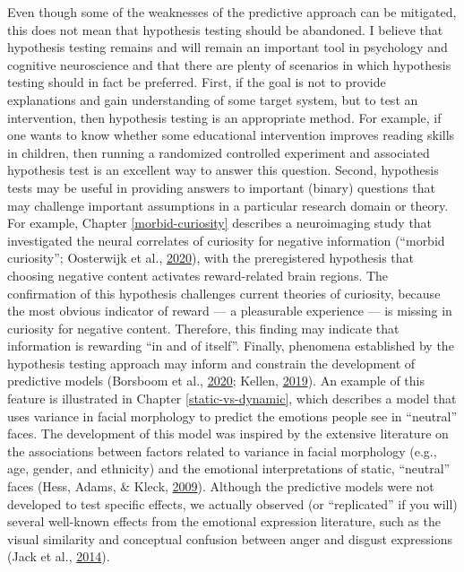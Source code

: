 \documentclass[12pt,american,a4paper,oneside,]{memoir} %
\begin{document}
Even though some of the weaknesses of the predictive approach can be mitigated, this does not mean that hypothesis testing should be abandoned. I believe that hypothesis testing remains and will remain an important tool in psychology and cognitive neuroscience and that there are plenty of scenarios in which hypothesis testing should in fact be preferred. First, if the goal is not to provide explanations and gain understanding of some target system, but to test an intervention, then hypothesis testing is an appropriate method. For example, if one wants to know whether some educational intervention improves reading skills in children, then running a randomized controlled experiment and associated hypothesis test is an excellent way to answer this question. Second, hypothesis tests may be useful in providing answers to important (binary) questions that may challenge important assumptions in a particular research domain or theory. For example, Chapter \ref{morbid-curiosity} describes a neuroimaging study that investigated the neural correlates of curiosity for negative information (``morbid curiosity''; Oosterwijk et al., \protect\hyperlink{ref-Oosterwijk2020-uf}{2020}), with the preregistered hypothesis that choosing negative content activates reward-related brain regions. The confirmation of this hypothesis challenges current theories of curiosity, because the most obvious indicator of reward --- a pleasurable experience --- is missing in curiosity for negative content. Therefore, this finding may indicate that information is rewarding ``in and of itself''. Finally, phenomena established by the hypothesis testing approach may inform and constrain the development of predictive models (Borsboom et al., \protect\hyperlink{ref-Borsboom2020-xg}{2020}; Kellen, \protect\hyperlink{ref-Kellen2019-af}{2019}). An example of this feature is illustrated in Chapter \ref{static-vs-dynamic}, which describes a model that uses variance in facial morphology to predict the emotions people see in ``neutral'' faces. The development of this model was inspired by the extensive literature on the associations between factors related to variance in facial morphology (e.g., age, gender, and ethnicity) and the emotional interpretations of static, ``neutral'' faces (Hess, Adams, \& Kleck, \protect\hyperlink{ref-Hess2009-xo}{2009}). Although the predictive models were not developed to test specific effects, we actually observed (or ``replicated'' if you will) several well-known effects from the emotional expression literature, such as the visual similarity and conceptual confusion between anger and disgust expressions (Jack et al., \protect\hyperlink{ref-Jack2014-ku}{2014}).
\end{document}
